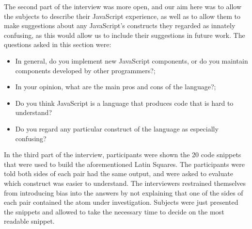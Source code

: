 The second part of the interview was more open, and our aim here was to allow the subjects to describe their JavaScript experience, as well as to allow them to make suggestions about any JavaScript's constructs they regarded as innately confusing, as this would allow us to include their suggestions in future work. The questions asked in this section were:
\begin{itemize}
    \item In general, do you implement new JavaScript components, or do you maintain components developed by other programmers?;
    \item In your opinion, what are the main pros and cons of the language?;
    \item Do you think JavaScript is a language that produces code that is hard to understand?
    \item Do you regard any particular construct of the language as especially confusing?
\end{itemize}


In the third part of the interview, participants were shown the 20 code snippets that were used to build the aforementioned Latin Squares. The participants were told both sides of each pair had the same output, and were asked to evaluate which construct was easier to understand. The interviewers restrained themselves from introducing bias into the answers by not explaining that one of the sides of each pair contained the atom under investigation. Subjects were just presented the snippets and allowed to take the necessary time to decide on the most readable snippet.


